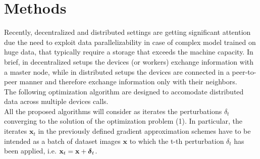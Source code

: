 \section{Methods}
Recently, decentralized and distributed settings are getting significant attention due the need to exploit data parallelizability in case of complex model trained on huge data, that typically require a storage that exceeds the machine capacity. In brief, in decentralized setups the devices (or workers) exchange information with a master node, while in distributed setups the devices are connected in a peer-to-peer manner and therefore exchange information only with their neighbors. \\ 
The following optimization algorithm are designed to accomodate distributed data across multiple devices calls.\\
All the proposed algorithms will consider as iterates the perturbations \mbox{\boldmath$ \delta$}$_t$ converging to the solution of the optimization problem (1). In particular, the iterates $\mathbf{x}_t$ in the previously defined gradient approximation schemes have to be intended as a batch of dataset images $\mathbf{x}$ to which the t-th perturbation \mbox{\boldmath$ \delta$}$_t$ has been applied, i.e. $\mathbf{x}_t = \mathbf{x} + \mbox{\boldmath$ \delta$}_t$.